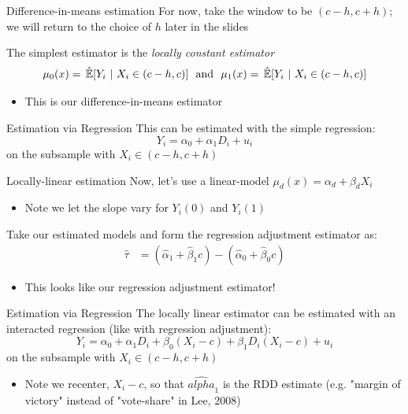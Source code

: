 \documentclass[aspectratio=169,t,11pt,table]{beamer}
\begin{document}


\begin{frame}{Difference-in-means estimation}{}
  For now, take the window to be $(c-h, c+h)$; we will return to the choice of $h$ later in the slides

  \bigskip
  The simplest estimator is the \emph{locally constant estimator}
  $$
    \mu_0(x) = \expechat{Y_i}{X_i \in (c-h, c)} \ \text{ and }\ \mu_1(x) = \expechat{Y_i}{X_i \in (c-h, c)}
  $$
  \begin{itemize}
    \item This is our difference-in-means estimator
  \end{itemize}
\end{frame}

\begin{frame}{Estimation via Regression}{}
  This can be estimated with the simple regression:
  $$
    Y_i = \alpha_0 + \alpha_1 D_i + u_i
  $$
  on the subsample with $X_i \in (c-h, c+h)$
\end{frame}


\begin{frame}{Locally-linear estimation}{}
  Now, let's use a linear-model $\mu_d(x) = \alpha_d + \beta_d X_i$
  \begin{itemize}
    \item Note we let the slope vary for $Y_i(0)$ and $Y_i(1)$
  \end{itemize}

  \bigskip
  Take our estimated models and form the regression adjustment estimator as:
  \begin{align*}
    \hat{\tau} 
    &= \left( \hat{\alpha}_1 + \hat{\beta}_1 c \right) - \left( \hat{\alpha}_0 + \hat{\beta}_0 c \right)
  \end{align*}
  \begin{itemize}
    \item This looks like our regression adjustment estimator!
  \end{itemize}
\end{frame}

\begin{frame}{Estimation via Regression}{}
  The locally linear estimator can be estimated with an interacted regression (like with regression adjustment):
  $$
    Y_i = \alpha_0 + \alpha_1 D_i + \beta_0 (X_i - c) + \beta_1 D_i (X_i - c) + u_i
  $$
  on the subsample with $X_i \in (c-h, c+h)$

  \begin{itemize}
    \item Note we recenter, $X_i - c$, so that $\hat{alpha}_1$ is the RDD estimate (e.g. "margin of victory" instead of "vote-share" in Lee, 2008)
  \end{itemize}
\end{frame}
\end{document}
